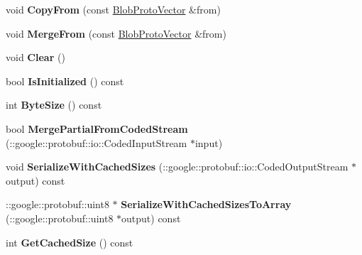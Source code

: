 \begin{DoxyCompactItemize}
void {\bfseries Copy\+From} (const \mbox{\hyperlink{classcaffe_1_1_blob_proto_vector}{Blob\+Proto\+Vector}} \&from)
\item 
\mbox{\label{classcaffe_1_1_blob_proto_vector_a367f54426e361e46dd593c34ad118800}} 
void {\bfseries Merge\+From} (const \mbox{\hyperlink{classcaffe_1_1_blob_proto_vector}{Blob\+Proto\+Vector}} \&from)
\item 
\mbox{\label{classcaffe_1_1_blob_proto_vector_a1b733bd689e570b5e45d4851971229aa}} 
void {\bfseries Clear} ()
\item 
\mbox{\label{classcaffe_1_1_blob_proto_vector_af26ae93fafd1e0d84708031b8a99a7da}} 
bool {\bfseries Is\+Initialized} () const
\item 
\mbox{\label{classcaffe_1_1_blob_proto_vector_ab2749716c3996c50147080f456be7b9d}} 
int {\bfseries Byte\+Size} () const
\item 
\mbox{\label{classcaffe_1_1_blob_proto_vector_a454119e39c3889744ca634852de8045b}} 
bool {\bfseries Merge\+Partial\+From\+Coded\+Stream} (\+::google\+::protobuf\+::io\+::\+Coded\+Input\+Stream $\ast$input)
\item 
\mbox{\label{classcaffe_1_1_blob_proto_vector_ad2e5f8a6870b2eecaab19959a39c71ff}} 
void {\bfseries Serialize\+With\+Cached\+Sizes} (\+::google\+::protobuf\+::io\+::\+Coded\+Output\+Stream $\ast$output) const
\item 
\mbox{\label{classcaffe_1_1_blob_proto_vector_ad99857aaa8a103862d81b508362f6e54}} 
\+::google\+::protobuf\+::uint8 $\ast$ {\bfseries Serialize\+With\+Cached\+Sizes\+To\+Array} (\+::google\+::protobuf\+::uint8 $\ast$output) const
\item 
\mbox{\label{classcaffe_1_1_blob_proto_vector_ada245fc65f0bd8ad30237885f7b733d1}} 
int {\bfseries Get\+Cached\+Size} () const
\item 
\mbox{\label{classcaffe_1_1_blob_proto_vector_a2968c7cf2057398c29ebabf04bbf9431}} 

\end{DoxyCompactItemize}
